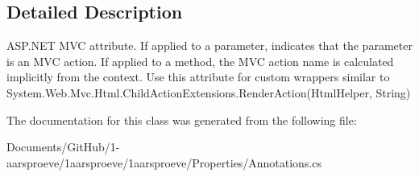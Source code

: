 \subsection{Detailed Description}
A\+S\+P.\+N\+E\+T M\+V\+C attribute. If applied to a parameter, indicates that the parameter is an M\+V\+C action. If applied to a method, the M\+V\+C action name is calculated implicitly from the context. Use this attribute for custom wrappers similar to {\ttfamily System.\+Web.\+Mvc.\+Html.\+Child\+Action\+Extensions.\+Render\+Action(\+Html\+Helper, String)} 



The documentation for this class was generated from the following file\+:\begin{DoxyCompactItemize}
\item 
Documents/\+Git\+Hub/1-\/aarsproeve/1aarsproeve/1aarsproeve/\+Properties/Annotations.\+cs\end{DoxyCompactItemize}
